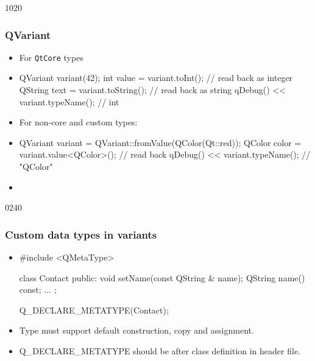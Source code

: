 \begin{slide}[fragile]{1020}\frametitle{QVariant}
\begin{itemize}
  \item For \texttt{QtCore} types  
  \item[] \begin{cpp}
QVariant variant(42);
int value = variant.toInt(); // read back as integer
QString text = variant.toString(); // read back as string
qDebug() << variant.typeName(); // int
\end{cpp}\vspace*{3mm}
\item For non-core and custom types:
  \item[] \begin{cpp}
QVariant variant = QVariant::fromValue(QColor(Qt::red));
QColor color = variant.value<QColor>(); // read back
qDebug() << variant.typeName(); // "QColor"
\end{cpp}\vspace*{3mm}
\item[] 
\end{itemize}
\end{slide}

\begin{slide}[fragile]{0240}
\frametitle{Custom data types in variants}
\begin{itemize}
\item[]
\begin{cpp}
#include <QMetaType>

class Contact
{
  public:
    void setName(const QString & name);
    QString name() const;
  ...
};

Q_DECLARE_METATYPE(Contact);
\end{cpp}\medskip
\item Type must support default construction, copy and assignment.\medskip
\item Q\_DECLARE\_METATYPE should be after class definition in header file.

\medskip
{}
\end{itemize}
\end{slide}

